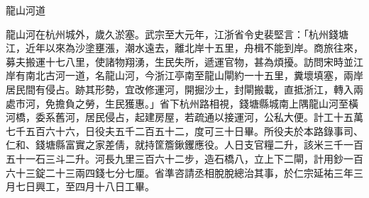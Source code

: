 \begin{pinyinscope}
 龍山河道



 龍山河在杭州城外，歲久淤塞。武宗至大元年，江浙省令史裴堅言：「杭州錢塘江，近年以來為沙塗壅漲，潮水遠去，離北岸十五里，舟楫不能到岸。商旅往來，募夫搬運十七八里，使諸物翔湧，生民失所，遞運官物，甚為煩擾。訪問宋時並江岸有南北古河一道，名龍山河，今浙江亭南至龍山閘約一十五里，糞壞填塞，兩岸居民間有侵占。跡其形勢，宜改修運河，開掘沙土，封閘搬載，直抵浙江，轉入兩處市河，免擔負之勞，生民獲惠。」省下杭州路相視，錢塘縣城南上隅龍山河至橫河橋，委系舊河，居民侵占，起建房屋，若疏通以接運河，公私大便。計工十五萬七千五百六十六，日役夫五千二百五十二，度可三十日畢。所役夫於本路錄事司、仁和、錢塘縣富實之家差倩，就持筐簷鍬钁應役。人日支官糧二升，該米三千一百五十一石三斗二升。河長九里三百六十二步，造石橋八，立上下二閘，計用鈔一百六十三錠二十三兩四錢七分七厘。省準咨請丞相脫脫總治其事，於仁宗延祐三年三月七日興工，至四月十八日工畢。



\end{pinyinscope}